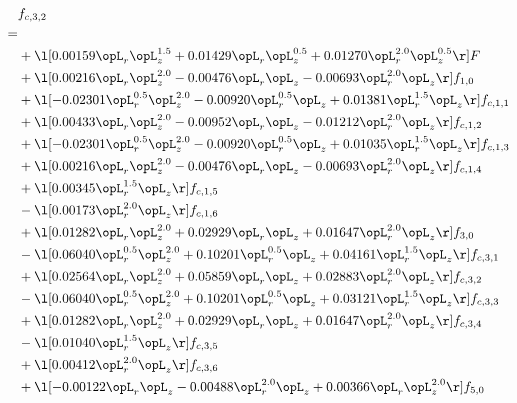 \begin{alignat}{2} 
\label{eq:f_32_1} 
& f_{c,3,2} \nonumber \\ 
 = \\ 
& + \l[  0.00159 \opL_r \opL_z^{1.5} +  0.01429 \opL_r \opL_z^{0.5} +  0.01270 \opL_r^{2.0} \opL_z^{0.5}  \r] F \nonumber \\ 
& + \l[  0.00216 \opL_r \opL_z^{2.0}   -0.00476 \opL_r \opL_z   -0.00693 \opL_r^{2.0} \opL_z  \r] f_{1,0} \nonumber \\ 
& + \l[  -0.02301 \opL_r^{0.5} \opL_z^{2.0}   -0.00920 \opL_r^{0.5} \opL_z +  0.01381 \opL_r^{1.5} \opL_z  \r] f_{c,1,1} \nonumber \\ 
& + \l[  0.00433 \opL_r \opL_z^{2.0}   -0.00952 \opL_r \opL_z   -0.01212 \opL_r^{2.0} \opL_z  \r] f_{c,1,2} \nonumber \\ 
& + \l[  -0.02301 \opL_r^{0.5} \opL_z^{2.0}   -0.00920 \opL_r^{0.5} \opL_z +  0.01035 \opL_r^{1.5} \opL_z  \r] f_{c,1,3} \nonumber \\ 
& + \l[  0.00216 \opL_r \opL_z^{2.0}   -0.00476 \opL_r \opL_z   -0.00693 \opL_r^{2.0} \opL_z  \r] f_{c,1,4} \nonumber \\ 
& + \l[  0.00345 \opL_r^{1.5} \opL_z  \r] f_{c,1,5} \nonumber \\ 
& - \l[  0.00173 \opL_r^{2.0} \opL_z  \r] f_{c,1,6} \nonumber \\ 
& + \l[  0.01282 \opL_r \opL_z^{2.0} +  0.02929 \opL_r \opL_z +  0.01647 \opL_r^{2.0} \opL_z  \r] f_{3,0} \nonumber \\ 
& - \l[  0.06040 \opL_r^{0.5} \opL_z^{2.0} +  0.10201 \opL_r^{0.5} \opL_z +  0.04161 \opL_r^{1.5} \opL_z  \r] f_{c,3,1} \nonumber \\ 
& + \l[  0.02564 \opL_r \opL_z^{2.0} +  0.05859 \opL_r \opL_z +  0.02883 \opL_r^{2.0} \opL_z  \r] f_{c,3,2} \nonumber \\ 
& - \l[  0.06040 \opL_r^{0.5} \opL_z^{2.0} +  0.10201 \opL_r^{0.5} \opL_z +  0.03121 \opL_r^{1.5} \opL_z  \r] f_{c,3,3} \nonumber \\ 
& + \l[  0.01282 \opL_r \opL_z^{2.0} +  0.02929 \opL_r \opL_z +  0.01647 \opL_r^{2.0} \opL_z  \r] f_{c,3,4} \nonumber \\ 
& - \l[  0.01040 \opL_r^{1.5} \opL_z  \r] f_{c,3,5} \nonumber \\ 
& + \l[  0.00412 \opL_r^{2.0} \opL_z  \r] f_{c,3,6} \nonumber \\ 
& + \l[  -0.00122 \opL_r \opL_z   -0.00488 \opL_r^{2.0} \opL_z +  0.00366 \opL_r \opL_z^{2.0}  \r] f_{5,0} \nonumber \\ 

\end{alignat}

